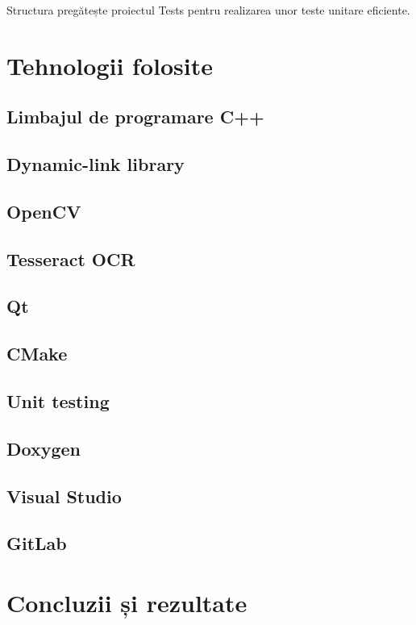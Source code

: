 \documentclass[a4paper,12pt]{report}
\begin{document}
Structura pregătește proiectul Tests pentru realizarea unor teste unitare eficiente.

\chapter{Tehnologii folosite}
\section{Limbajul de programare C++}

\section{Dynamic-link library}

\section{OpenCV}

\section{Tesseract OCR}

\section{Qt}

\section{CMake}

\section{Unit testing}

\section{Doxygen}

\section{Visual Studio}

\section{GitLab}

\chapter{Concluzii și rezultate}
\end{document}
